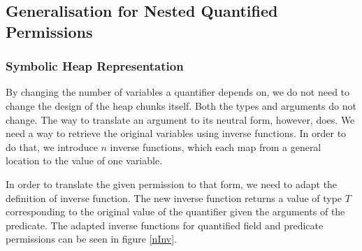 \documentclass[12pt]{article}
\begin{document}
\subsection{Generalisation for Nested Quantified Permissions}
\label{generalN}




\subsubsection{Symbolic Heap Representation} \label{shr}
By changing the number of variables a quantifier depends on, we do not need to change the design of the heap chunks itself. Both the types and arguments do not change. The way to translate an argument to its neutral form, however, does. We need a way to retrieve the original variables using inverse functions. In order to do that, we introduce \(n\) inverse functions, which each map from a general location to the value of one variable.

In order to translate the given permission to that form, we need to adapt the definition of inverse function. The new inverse function returns a value of type \(T\) corresponding to the original value of the quantifier given the arguments of the predicate. The adapted inverse functions for quantified field and predicate permissions can be seen in figure \ref{nInv}.
\end{document}
